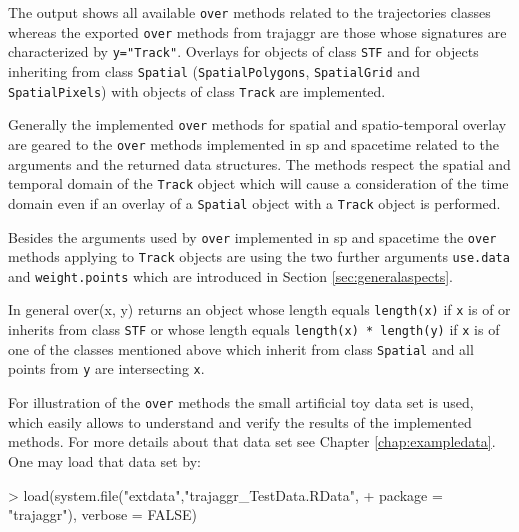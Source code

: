 \documentclass[12pt, oneside, a4paper]{scrbook}
\newcommand{\pkg}[1]{{\normalfont\fontseries{b}\selectfont #1}}
\let\code=\texttt
\begin{document}
The output shows all available \code{over} methods related to the \pkg{trajectories} classes whereas the exported \code{over} methods from \pkg{trajaggr} are those whose signatures are characterized by \code{y="Track"}. 
Overlays for objects of class \code{STF} and for objects inheriting from class \code{Spatial} (\code{SpatialPolygons}, \code{SpatialGrid} and \code{SpatialPixels}) with objects of class \code{Track} are implemented.
\par\medskip

Generally the implemented \code{over} methods for spatial and spatio-temporal overlay are geared to the \code{over} methods implemented in \pkg{sp} and \pkg{spacetime} related to the arguments and the returned data structures. 
The methods respect the spatial and temporal domain of the \code{Track} object which will cause a consideration of the time domain even if an overlay of a \code{Spatial} object with a \code{Track} object is performed. 
\par\medskip

Besides the arguments used by \code{over} implemented in \pkg{sp} and \pkg{spacetime} the \code{over} methods applying to \code{Track} objects 
are using the two further arguments \code{use.data} and \code{weight.points} which are introduced in Section \ref{sec:generalaspects}.
\par\medskip


In general over(x, y) returns an object whose length equals \code{length(x)} if \code{x} is of or inherits from class \code{STF} or whose length equals \code{length(x) * length(y)} if \code{x} is of one of the classes mentioned above which inherit from class \code{Spatial} and all points from \code{y} are intersecting \code{x}.
\par\medskip

For illustration of the \code{over} methods the small artificial toy data set is used, which easily allows to understand and verify the results of the implemented methods. 
For more details about that data set see Chapter \ref{chap:exampledata}. One may load that data set by:

\begin{small}
\begin{Schunk}
\begin{Sinput}
> load(system.file("extdata","trajaggr_TestData.RData", 
+                  package = "trajaggr"), verbose = FALSE)
\end{Sinput}
\end{Schunk}
\end{small}
\end{document}
